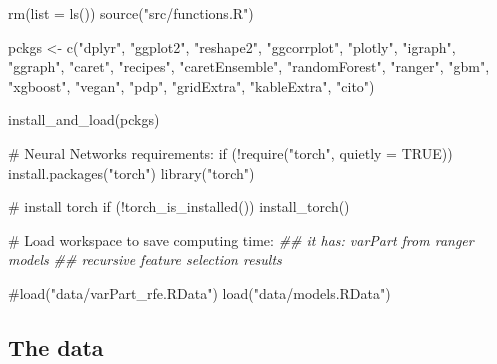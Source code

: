 \documentclass[
  letterpaper,
  DIV=11,
  numbers=noendperiod]{scrartcl}
\newenvironment{Shaded}{\begin{snugshade}}{\end{snugshade}}
\newcommand{\AttributeTok}[1]{\textcolor[rgb]{0.40,0.45,0.13}{#1}}
\newcommand{\CommentTok}[1]{\textcolor[rgb]{0.37,0.37,0.37}{#1}}
\newcommand{\ConstantTok}[1]{\textcolor[rgb]{0.56,0.35,0.01}{#1}}
\newcommand{\ControlFlowTok}[1]{\textcolor[rgb]{0.00,0.23,0.31}{#1}}
\newcommand{\DocumentationTok}[1]{\textcolor[rgb]{0.37,0.37,0.37}{\textit{#1}}}
\newcommand{\FunctionTok}[1]{\textcolor[rgb]{0.28,0.35,0.67}{#1}}
\newcommand{\NormalTok}[1]{\textcolor[rgb]{0.00,0.23,0.31}{#1}}
\newcommand{\OtherTok}[1]{\textcolor[rgb]{0.00,0.23,0.31}{#1}}
\newcommand{\SpecialCharTok}[1]{\textcolor[rgb]{0.37,0.37,0.37}{#1}}
\newcommand{\StringTok}[1]{\textcolor[rgb]{0.13,0.47,0.30}{#1}}
\begin{document}
\begin{Shaded}
\begin{Highlighting}[]
\FunctionTok{rm}\NormalTok{(}\AttributeTok{list =} \FunctionTok{ls}\NormalTok{())}
\FunctionTok{source}\NormalTok{(}\StringTok{"src/functions.R"}\NormalTok{)}

\NormalTok{pckgs }\OtherTok{\textless{}{-}} \FunctionTok{c}\NormalTok{(}\StringTok{"dplyr"}\NormalTok{, }\StringTok{"ggplot2"}\NormalTok{, }\StringTok{"reshape2"}\NormalTok{, }
           \StringTok{"ggcorrplot"}\NormalTok{, }\StringTok{"plotly"}\NormalTok{, }\StringTok{"igraph"}\NormalTok{, }\StringTok{"ggraph"}\NormalTok{,}
           \StringTok{"caret"}\NormalTok{,  }\StringTok{"recipes"}\NormalTok{,   }\StringTok{"caretEnsemble"}\NormalTok{, }
           \StringTok{"randomForest"}\NormalTok{, }\StringTok{"ranger"}\NormalTok{, }\StringTok{"gbm"}\NormalTok{, }\StringTok{"xgboost"}\NormalTok{, }
           \StringTok{"vegan"}\NormalTok{, }\StringTok{"pdp"}\NormalTok{, }
           \StringTok{"gridExtra"}\NormalTok{, }\StringTok{"kableExtra"}\NormalTok{, }
           \StringTok{"cito"}\NormalTok{)}

\FunctionTok{install\_and\_load}\NormalTok{(pckgs)}

\CommentTok{\# Neural Networks requirements:}
\ControlFlowTok{if}\NormalTok{ (}\SpecialCharTok{!}\FunctionTok{require}\NormalTok{(}\StringTok{"torch"}\NormalTok{, }\AttributeTok{quietly =} \ConstantTok{TRUE}\NormalTok{)) }\FunctionTok{install.packages}\NormalTok{(}\StringTok{"torch"}\NormalTok{)}
\FunctionTok{library}\NormalTok{(}\StringTok{"torch"}\NormalTok{)}

\CommentTok{\# install torch}
\ControlFlowTok{if}\NormalTok{ (}\SpecialCharTok{!}\FunctionTok{torch\_is\_installed}\NormalTok{()) }\FunctionTok{install\_torch}\NormalTok{()}

\CommentTok{\# Load workspace to save computing time:}
\DocumentationTok{\#\# it has: varPart from ranger models}
\DocumentationTok{\#\# recursive feature selection results}

\CommentTok{\#load("data/varPart\_rfe.RData")}
\FunctionTok{load}\NormalTok{(}\StringTok{"data/models.RData"}\NormalTok{)}
\end{Highlighting}
\end{Shaded}

\subsection{The data}\label{the-data}
\end{document}
